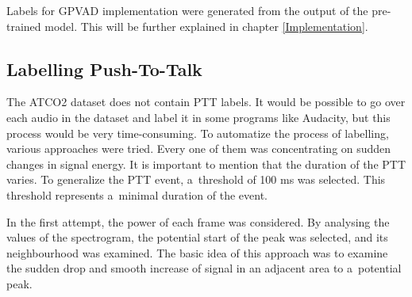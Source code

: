        Labels for GPVAD implementation were generated from the output of the pre-trained model. This will be further explained in chapter \ref{Implementation}. 
        

    \subsection{Labelling Push-To-Talk}\label{LabelPTT}

    The ATCO2 dataset does not contain PTT labels. It would be possible to go over each audio in the dataset and label it in some programs like Audacity, but this process would be very time-consuming. To automatize the process of labelling, various approaches were tried.
    Every one of them was concentrating on sudden changes in signal energy. It is important to mention that the duration of the PTT varies. To generalize the PTT event, a~threshold of 100 ms was selected. This threshold represents a~minimal duration of the event. 

    In the first attempt, the power of each frame was considered. By analysing the values of the spectrogram, the potential start of the peak was selected, and its neighbourhood was examined. The basic idea of this approach was to examine the sudden drop and smooth increase of signal in an adjacent area to a~potential peak. 
    \newpage

